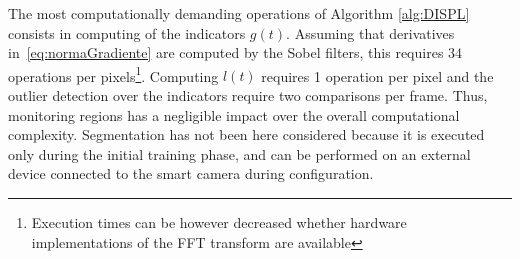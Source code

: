 \documentclass{llncs}
\begin{document}
The most computationally demanding operations of Algorithm \ref{alg:DISPL} consists in computing of the indicators $g(t)$. Assuming that derivatives in~\eqref{eq:normaGradiente} are computed by the Sobel filters, this requires $34$ operations per pixels\footnote{Execution times can be however  decreased whether hardware implementations of the FFT transform are available}. Computing $l(t)$ requires 1 operation per pixel and the outlier detection over the indicators require two comparisons per frame. Thus, monitoring regions has a negligible impact over the overall computational complexity. 
Segmentation has not been here considered because it is executed only during the initial training phase, and can be performed on an external device connected to the smart camera during configuration.

	

\end{document}
